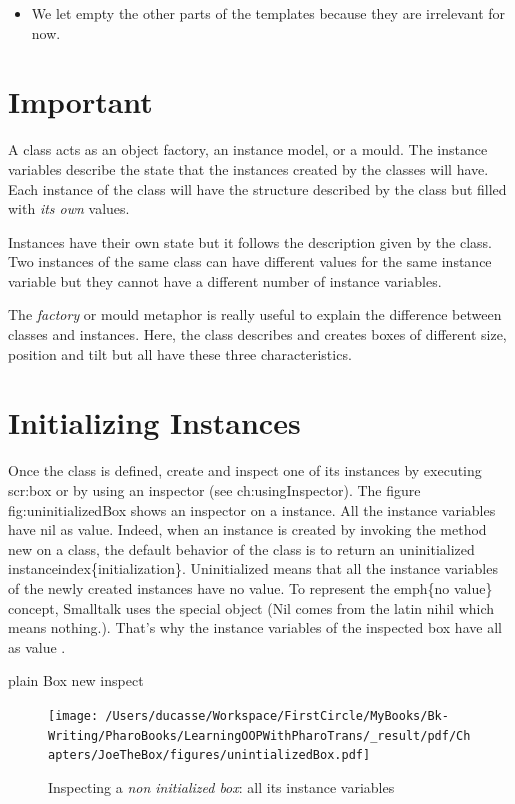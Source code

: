 \documentclass[10pt,twoside,english]{_support/latex/sbabook/sbabook}
\begin{document}
\begin{itemize}
\item We let empty the other parts of the templates because they are irrelevant for now.
\end{itemize}
\section{Important}
A class acts as an object factory, an instance model, or a mould. 
The instance variables describe the state that  the instances created 
by the classes will have. Each instance of the class will have the structure 
described by the class but filled with \textit{its own} values.

Instances have their own state but it follows the description given by the class. Two instances of the same class can have different values for the same instance variable but they cannot have a different number of instance variables. 

The \textit{factory} or mould metaphor is really useful to explain the difference between classes and instances. Here, the class  describes and creates boxes of different size, position and tilt but all have these three characteristics.
\section{Initializing Instances}
Once the class is defined, create and inspect one of its instances by
executing scr:box or by using an inspector (see ch:usingInspector).  The
figure fig:uninitializedBox shows an inspector on a 
instance.  All the instance variables have nil as
value.  Indeed, when an instance is created by invoking the method
new on a class, the default behavior of the
class is to return an uninitialized
instanceindex\{initialization\}.  Uninitialized means that all the
instance variables of the newly created instances have no value.  To
represent the emph\{no value\} concept, Smalltalk  uses the special object 
 (Nil comes from the latin nihil which means
nothing.). 
That's why the instance variables of the inspected box have all as value .

\begin{displaycode}{plain}
Box new inspect
\end{displaycode}


\begin{figure}

\begin{center}
\texttt{[image: /Users/ducasse/Workspace/FirstCircle/MyBooks/Bk-Writing/PharoBooks/LearningOOPWithPharoTrans/\_result/pdf/Chapters/JoeTheBox/figures/unintializedBox.pdf]}\caption{Inspecting a \textit{non initialized box}: all its instance variables \label{unintializedBox}}\end{center}
\end{figure}
 
\end{document}
